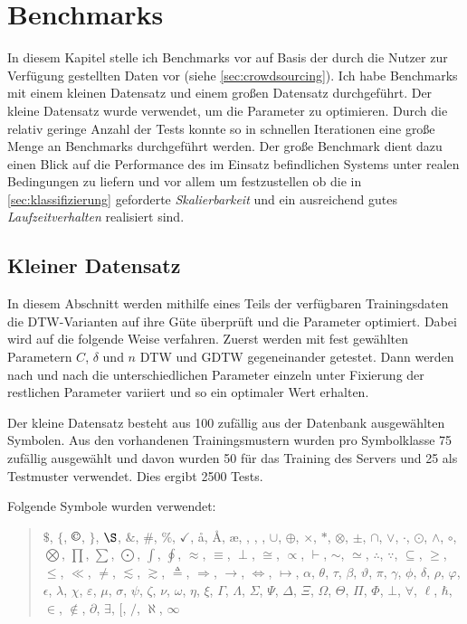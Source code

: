 \chapter{Benchmarks} %
\label{cha:benchmarks}

In diesem Kapitel stelle ich Benchmarks vor auf Basis der durch die Nutzer zur Verfügung gestellten Daten vor (siehe \ref{sec:crowdsourcing}). Ich habe Benchmarks mit einem kleinen Datensatz und einem großen Datensatz durchgeführt. Der kleine Datensatz wurde verwendet, um die Parameter zu optimieren. Durch die relativ geringe Anzahl der Tests konnte so in schnellen Iterationen eine große Menge an Benchmarks durchgeführt werden. Der große Benchmark dient dazu einen Blick auf die Performance des im Einsatz befindlichen Systems unter realen Bedingungen zu liefern und vor allem um festzustellen ob die in \ref{sec:klassifizierung} geforderte \emph{Skalierbarkeit} und ein ausreichend gutes \emph{Laufzeitverhalten} realisiert sind.

\section{Kleiner Datensatz}
\label{sec:kleiner_datensatz}

In diesem Abschnitt werden mithilfe eines Teils der verfügbaren Trainingsdaten die DTW-Varianten auf ihre Güte überprüft und die Parameter optimiert. Dabei wird auf die folgende Weise verfahren. Zuerst werden mit fest gewählten Parametern $C$, $\delta$ und $n$ \ac{DTW} und \ac{GDTW} gegeneinander getestet. Dann werden nach und nach die unterschiedlichen Parameter einzeln unter Fixierung der restlichen Parameter variiert und so ein optimaler Wert erhalten.

Der kleine Datensatz besteht aus 100 zufällig aus der Datenbank ausgewählten Symbolen. Aus den vorhandenen Trainingsmustern wurden pro Symbolklasse 75 zufällig ausgewählt und davon wurden 50 für das Training des Servers und 25 als Testmuster verwendet. Dies ergibt 2500 Tests.

Folgende Symbole wurden verwendet:

\begin{quote}
$\$$,
$\{$,
$\copyright$,
$\}$,
$\S$,
$\&$,
$\#$,
$\%$,
$\checkmark$,
\aa,
\AA,
\ae,
\DH,
\DJ,
\EUR,
$\cup$,
$\oplus$,
$\times$,
$\ast$,
$\otimes$,
$\pm$,
$\cap$,
$\vee$,
$\cdot$,
$\odot$,
$\wedge$,
$\circ$,
$\bigotimes$,
$\prod$,
$\sum$,
$\bigodot$,
$\int$,
$\oint$,
$\approx$,
$\equiv$,
$\perp$,
$\cong$,
$\propto$,
$\vdash$,
$\sim$,
$\simeq$,
$\therefore$,
$\because$,
$\subseteq$,
$\geq$,
$\leq$,
$\ll$,
$\neq$,
$\lesssim$,
$\gtrsim$,
$\triangleq$,
$\Rightarrow$,
$\rightarrow$,
$\Leftrightarrow$,
$\mapsto$,
$\alpha$,
$\theta$,
$\tau$,
$\beta$,
$\vartheta$,
$\pi$,
$\gamma$,
$\phi$,
$\delta$,
$\rho$,
$\varphi$,
$\epsilon$,
$\lambda$,
$\chi$,
$\varepsilon$,
$\mu$,
$\sigma$,
$\psi$,
$\zeta$,
$\nu$,
$\omega$,
$\eta$,
$\xi$,
$\Gamma$,
$\Lambda$,
$\Sigma$,
$\Psi$,
$\Delta$,
$\Xi$,
$\Omega$,
$\Theta$,
$\Pi$,
$\Phi$,
$\bot$,
$\forall$,
$\ell$,
$\hbar$,
$\in$,
$\not\in$,
$\partial$,
$\exists$,
$[$,
$/$,
$\aleph$,
$\infty$
\end{quote}


